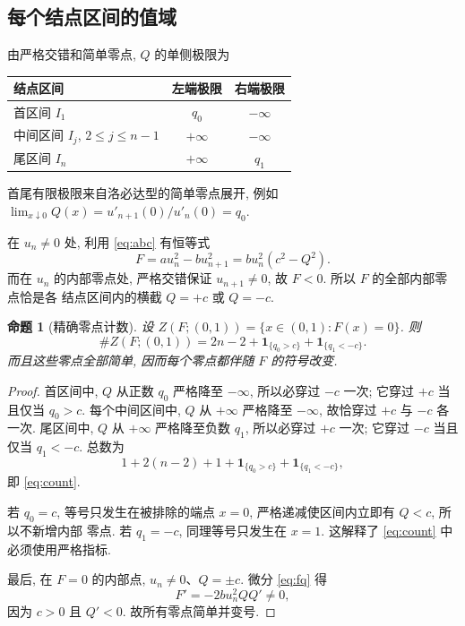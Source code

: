 \documentclass[UTF8]{ctexart}
\newtheorem{proposition}[theorem]{命题}
\begin{document}
\subsection{每个结点区间的值域}

由严格交错和简单零点, $Q$ 的单侧极限为
\begin{center}
\begin{tabular}{lcc}
\toprule
结点区间 & 左端极限 & 右端极限\\
\midrule
首区间 $I_1$ & $q_0$ & $-\infty$\\
中间区间 $I_j$, $2\le j\le n-1$ & $+\infty$ & $-\infty$\\
尾区间 $I_n$ & $+\infty$ & $q_1$\\
\bottomrule
\end{tabular}
\end{center}
首尾有限极限来自洛必达型的简单零点展开, 例如 $\lim_{x\downarrow0}Q(x)=u'_{n+1}(0)/u'_n(0)=q_0$.

在 $u_n\ne0$ 处, 利用 \eqref{eq:abc} 有恒等式
\begin{equation}
	F=au_n^2-bu_{n+1}^2=bu_n^2\left(c^2-Q^2\right) .
	\label{eq:fq}
\end{equation}
而在 $u_n$ 的内部零点处, 严格交错保证 $u_{n+1}\ne0$, 故 $F<0$. 所以 $F$ 的全部内部零点恰是各
结点区间内的横截 $Q=+c$ 或 $Q=-c$.

\begin{proposition}[精确零点计数]\label{prop:count}
设 $Z(F;(0,1))=\{x\in(0,1):F(x)=0\}$. 则
\begin{equation}
	\#Z(F;(0,1))=2n-2+\mathbf 1_{\{q_0>c\}}+\mathbf 1_{\{q_1<-c\}} .
	\label{eq:count}
\end{equation}
而且这些零点全部简单, 因而每个零点都伴随 $F$ 的符号改变.
\end{proposition}

\begin{proof}
首区间中, $Q$ 从正数 $q_0$ 严格降至 $-\infty$, 所以必穿过 $-c$ 一次; 它穿过 $+c$ 当且仅当
$q_0>c$. 每个中间区间中, $Q$ 从 $+\infty$ 严格降至 $-\infty$, 故恰穿过 $+c$ 与 $-c$ 各一次.
尾区间中, $Q$ 从 $+\infty$ 严格降至负数 $q_1$, 所以必穿过 $+c$ 一次; 它穿过 $-c$ 当且仅当
$q_1<-c$. 总数为
\begin{equation*}
	1+2(n-2)+1+\mathbf 1_{\{q_0>c\}}+\mathbf 1_{\{q_1<-c\}},
\end{equation*}
即 \eqref{eq:count}.

若 $q_0=c$, 等号只发生在被排除的端点 $x=0$, 严格递减使区间内立即有 $Q<c$, 所以不新增内部
零点. 若 $q_1=-c$, 同理等号只发生在 $x=1$. 这解释了 \eqref{eq:count} 中必须使用严格指标.

最后, 在 $F=0$ 的内部点, $u_n\ne0$、$Q=\pm c$. 微分 \eqref{eq:fq} 得
\begin{equation}
	F'=-2bu_n^2QQ'\ne0,
	\label{eq:fprime}
\end{equation}
因为 $c>0$ 且 $Q'<0$. 故所有零点简单并变号.
\end{proof}
\end{document}
